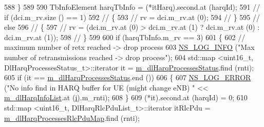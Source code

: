 \begin{DoxyCode}
{588                                 \}
589 
590                                 TbInfoElement harqTbInfo = (*itHarq).second.at (harqId);
591                                 \textcolor{comment}{//                      if (dci.m\_rv.size () == 1)}
592                                 \textcolor{comment}{//                      \{}
593                                 \textcolor{comment}{//                              rv = dci.m\_rv.at (0);}
594                                 \textcolor{comment}{//                      \}}
595                                 \textcolor{comment}{//                      else}
596                                 \textcolor{comment}{//                      \{}
597                                 \textcolor{comment}{//                              rv = (dci.m\_rv.at (0) > dci.m\_rv.at (1) ?
       dci.m\_rv.at (0) : dci.m\_rv.at (1));}
598                                 \textcolor{comment}{//                      \}}
599 
600                                 \textcolor{keywordflow}{if} (harqTbInfo.m\_rv == 3)
601                                 \{
602                                         \textcolor{comment}{// maximum number of retx reached -> drop process}
603                                         \hyperlink{group__logging_gafbd73ee2cf9f26b319f49086d8e860fb}{NS\_LOG\_INFO} (\textcolor{stringliteral}{"Max number of retransmissions reached ->
       drop process"});
604                                         std::map <uint16\_t, DlHarqProcessesStatus\_t>::iterator it = 
      \hyperlink{classns3_1_1MmWaveRrMacScheduler_a5734289010d38bd8dfe04ed50ba99936}{m\_dlHarqProcessesStatus}.find (rnti);
605                                         \textcolor{keywordflow}{if} (it == \hyperlink{classns3_1_1MmWaveRrMacScheduler_a5734289010d38bd8dfe04ed50ba99936}{m\_dlHarqProcessesStatus}.end ())
606                                         \{
607                                                 \hyperlink{group__logging_ga0261a8db1d4ac5f79417d117634fd455}{NS\_LOG\_ERROR} (\textcolor{stringliteral}{"No info find in HARQ buffer for
       UE (might change eNB) "} << \hyperlink{classns3_1_1MmWaveRrMacScheduler_a1b1043d7f9994e2ee6a7e1b368e9d7a1}{m\_dlHarqInfoList}.at (\hyperlink{bernuolliDistribution_8m_a6f6ccfcf58b31cb6412107d9d5281426}{i}).m\_rnti);
608                                         \}
609                                         (*it).second.at (harqId) = 0;
610                                         std::map <uint16\_t, DlHarqRlcPduList\_t>::iterator itRlcPdu =  
      \hyperlink{classns3_1_1MmWaveRrMacScheduler_a51e5c8d3c34be4e070f2fb3e621cd418}{m\_dlHarqProcessesRlcPduMap}.find (rnti);
}
\end{DoxyCode}
